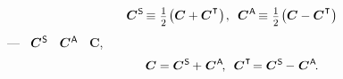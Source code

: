 %
\begin{equation}\label{symmetricandantisymmetricpartsofbivalent}
\bm{C}^{\mathsf{\hspace{.1ex}S}} \hspace{-0.22ex} \equiv \hspace{.1ex} \displaystyle \smalldisplaystyleonehalf \hspace{-0.2ex} \left( {\bm{C} + \bm{C}^{\hspace{.1ex}\T}}\hspace{.1ex} \right)
\hspace{-0.2ex} , \hspace{.5em}
\bm{C}^{\mathsf{\hspace{.1ex}A}} \hspace{-0.22ex} \equiv \hspace{.1ex} \displaystyle \smalldisplaystyleonehalf \hspace{-0.2ex} \left( {\bm{C} - \bm{C}^{\hspace{.1ex}\T}}\hspace{.1ex} \right)
\end{equation}
%
---
~${\bm{C}^{\mathsf{\hspace{.1ex}S}}}$
~${\bm{C}^{\mathsf{\hspace{.1ex}A}}}$
~${\bm{C}}$,
%
\begin{equation}\label{bivalentasthesumofsymmetricandantisymmetricparts}
\bm{C} = \bm{C}^{\mathsf{\hspace{.1ex}S}} \hspace{-0.1ex} + \hspace{.1ex} \bm{C}^{\mathsf{\hspace{.1ex}A}}
\hspace{-0.3ex} , \hspace{.5em}
\bm{C}^{\hspace{.1ex}\T} \hspace{-0.33ex} = \bm{C}^{\mathsf{\hspace{.1ex}S}} \hspace{-0.1ex}-\hspace{.1ex} \bm{C}^{\mathsf{\hspace{.1ex}A}}
\hspace{-0.3ex} .
\end{equation}

